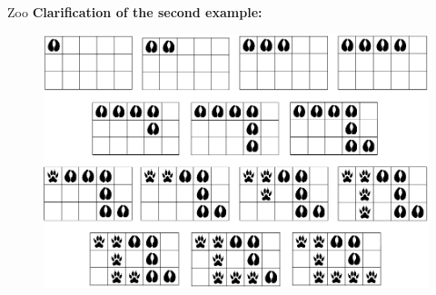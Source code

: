 \begin{statement}[
  problempoints=110,
  timelimit=1 second,
  memorylimit=512 MiB,
]{Zoo}
\textbf{Clarification of the second example:}

\begin{figure}
\centering
\includegraphics[width=\textwidth]{img/escape.png}
\end{figure}

\end{statement}

